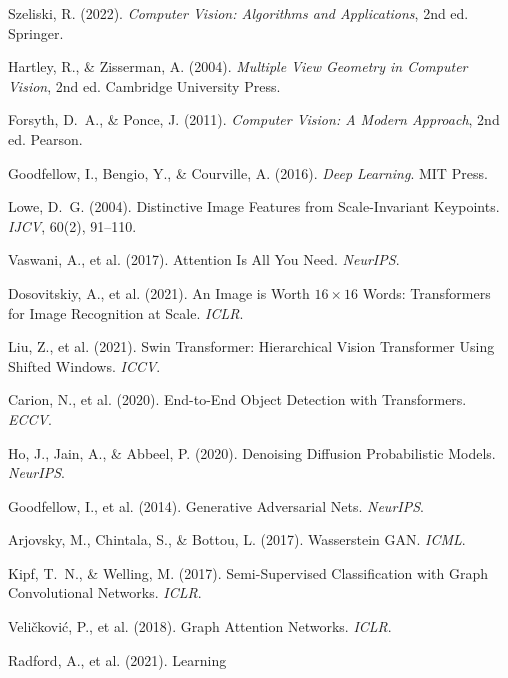 \documentclass[12pt,a4paper]{report}
\begin{document}
\begin{enumerate}[itemsep=2pt, label={[\arabic*]}]
    \item Szeliski, R. (2022). \textit{Computer Vision: Algorithms and
          Applications}, 2nd ed. Springer.
    \item Hartley, R., \& Zisserman, A. (2004). \textit{Multiple View
          Geometry in Computer Vision}, 2nd ed. Cambridge University Press.
    \item Forsyth, D.~A., \& Ponce, J. (2011). \textit{Computer Vision:
          A Modern Approach}, 2nd ed. Pearson.
    \item Goodfellow, I., Bengio, Y., \& Courville, A. (2016).
          \textit{Deep Learning}. MIT Press.
    \item \label{lowe2004} Lowe, D.~G. (2004). Distinctive Image Features
          from Scale-Invariant Keypoints. \textit{IJCV}, 60(2), 91--110.
    \item \label{vaswani2017attention} Vaswani, A., et al. (2017). Attention
          Is All You Need. \textit{NeurIPS}.
    \item \label{dosovitskiy2021vit} Dosovitskiy, A., et al. (2021). An
          Image is Worth $16\!\times\!16$ Words: Transformers for Image
          Recognition at Scale. \textit{ICLR}.
    \item \label{liu2021swin} Liu, Z., et al. (2021). Swin Transformer:
          Hierarchical Vision Transformer Using Shifted Windows. \textit{ICCV}.
    \item \label{carion2020detr} Carion, N., et al. (2020). End-to-End Object
          Detection with Transformers. \textit{ECCV}.
    \item \label{ho2020ddpm} Ho, J., Jain, A., \& Abbeel, P. (2020).
          Denoising Diffusion Probabilistic Models. \textit{NeurIPS}.
    \item \label{goodfellow2014gan} Goodfellow, I., et al. (2014).
          Generative Adversarial Nets. \textit{NeurIPS}.
    \item \label{arjovsky2017wgan} Arjovsky, M., Chintala, S., \& Bottou, L.
          (2017). Wasserstein GAN. \textit{ICML}.
    \item \label{kipf2017gcn} Kipf, T.~N., \& Welling, M. (2017).
          Semi-Supervised Classification with Graph Convolutional Networks.
          \textit{ICLR}.
    \item \label{velickovic2018gat} Veli\v{c}kovi\'c, P., et al. (2018).
          Graph Attention Networks. \textit{ICLR}.
    \item \label{radford2021clip} Radford, A., et al. (2021). Learning

\end{enumerate}
\end{document}
